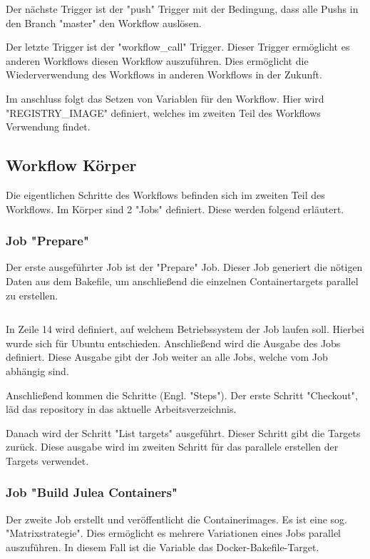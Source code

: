 Der nächste Trigger ist der "push" Trigger mit der Bedingung, dass alle Pushs in den Branch "master" den Workflow auslösen.

Der letzte Trigger ist der "workflow\_call" Trigger. Dieser Trigger ermöglicht es anderen Workflows diesen Workflow auszuführen. Dies ermöglicht die Wiederverwendung des Workflows in anderen Workflows in der Zukunft. 

Im anschluss folgt das Setzen von Variablen für den Workflow. Hier wird "REGISTRY\_IMAGE" definiert, welches im zweiten Teil des Workflows Verwendung findet.

\subsection{Workflow Körper}

Die eigentlichen Schritte des Workflows befinden sich im zweiten Teil des Workflows. Im Körper sind 2 "Jobs" definiert. Diese werden folgend erläutert.

\subsubsection{Job "Prepare"}

Der erste ausgeführter Job ist der "Prepare" Job. Dieser Job generiert die nötigen Daten aus dem Bakefile, um anschließend die einzelnen Containertargets parallel zu erstellen.

\inputminted[firstline=12,lastline=23]{yaml}{./code-examples/containers-ci.yml}

In Zeile 14 wird definiert, auf welchem Betriebssystem der Job laufen soll. Hierbei wurde sich für Ubuntu entschieden. 
Anschließend wird die Ausgabe des Jobs definiert. Diese Ausgabe gibt der Job weiter an alle Jobs, welche vom Job abhängig sind.

Anschließend kommen die Schritte (Engl. "Steps"). Der erste Schritt "Checkout", läd das repository in das aktuelle Arbeitsverzeichnis.

Danach wird der Schritt "List targets" ausgeführt. Dieser Schritt gibt die Targets zurück. Diese ausgabe wird im zweiten Schritt für das parallele erstellen der Targets verwendet.

\subsubsection{Job "Build Julea Containers"}

Der zweite Job erstellt und veröffentlicht die Containerimages. Es ist eine sog. "Matrixstrategie". Dies ermöglicht es mehrere Variationen eines Jobs parallel auszuführen. In diesem Fall ist die Variable das Docker-Bakefile-Target. 

